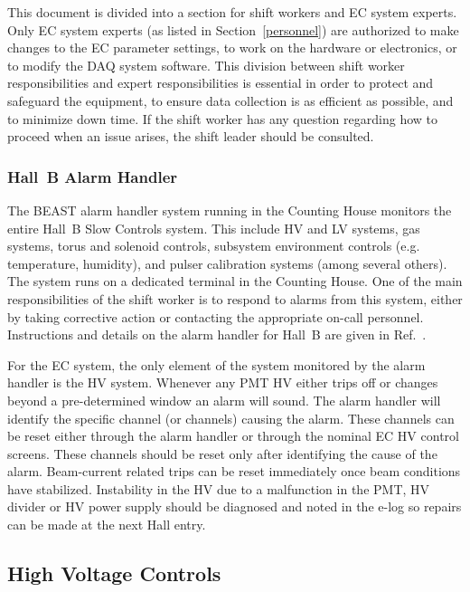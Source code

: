 \documentclass[letterpaper,10pt]{article}
\begin{document}
This document is divided into a section for shift workers and EC system experts. Only 
EC system experts (as listed in Section~\ref{personnel}) are authorized to make changes to the EC
parameter settings, to work on the hardware or electronics, or to modify the DAQ system 
software. This division between shift worker responsibilities and expert responsibilities is
essential in order to protect and safeguard the equipment, to ensure data collection
is as efficient as possible, and to minimize down time. If the shift worker has any question 
regarding how to proceed when an issue arises, the shift leader should be consulted. 

\subsubsection{Hall~B Alarm Handler}
\label{alarms}

The BEAST alarm handler system running in the Counting House monitors the entire Hall~B Slow Controls
system. This include HV and LV systems, gas systems, torus and solenoid controls, subsystem
environment controls (e.g. temperature, humidity), and pulser calibration systems (among several
others). The system runs on a dedicated terminal in the Counting House. One of the main responsibilities
of the shift worker is to respond to alarms from this system, either by taking corrective action
or contacting the appropriate on-call personnel. Instructions and details on the alarm handler for Hall~B
are given in Ref.~\cite{beast}.

For the EC system, the only element of the system monitored by the alarm handler is the HV system.
Whenever any PMT HV either trips off or changes beyond a pre-determined window an alarm will sound.
The alarm handler will identify the specific channel (or channels) causing the alarm. These channels can
be reset either through the alarm handler or through the nominal EC HV control screens. These channels
should be reset only after identifying the cause of the alarm.  Beam-current related trips can be reset
immediately once beam conditions have stabilized.  Instability in the HV due to a malfunction in the PMT,
HV divider or HV power supply should be diagnosed and noted in the e-log so repairs can be made at
the next Hall entry.  

\subsection{High Voltage Controls}
\label{hv-control}
\end{document}
